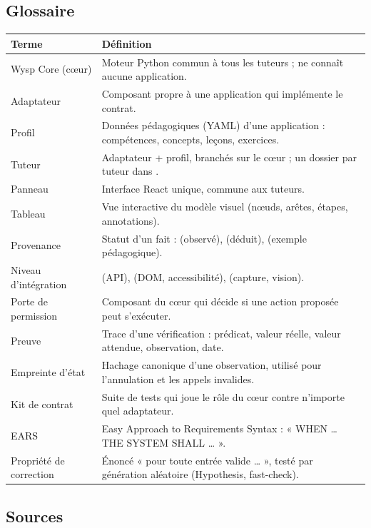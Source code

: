 \subsection{Glossaire}

\begin{xltabular}{\textwidth}{@{}L{3.6cm}Y@{}}
\toprule
\textbf{Terme} & \textbf{Définition} \\
\midrule
Wysp Core (cœur) & Moteur Python commun à tous les tuteurs ; ne connaît aucune application. \\
Adaptateur & Composant propre à une application qui implémente le contrat. \\
Profil & Données pédagogiques (YAML) d'une application : compétences, concepts, leçons, exercices. \\
Tuteur & Adaptateur + profil, branchés sur le cœur ; un dossier par tuteur dans . \\
Panneau & Interface React unique, commune aux tuteurs. \\
Tableau & Vue interactive du modèle visuel (nœuds, arêtes, étapes, annotations). \\
Provenance & Statut d'un fait : \pobs{} (observé), \pinf{} (déduit), \pill{} (exemple pédagogique). \\
Niveau d'intégration &  (API),  (DOM, accessibilité),  (capture, vision). \\
Porte de permission & Composant du cœur qui décide si une action proposée peut s'exécuter. \\
Preuve & Trace d'une vérification : prédicat, valeur réelle, valeur attendue, observation, date. \\
Empreinte d'état & Hachage canonique d'une observation, utilisé pour l'annulation et les appels invalides. \\
Kit de contrat & Suite de tests qui joue le rôle du cœur contre n'importe quel adaptateur. \\
EARS & Easy Approach to Requirements Syntax : « WHEN \dots{} THE SYSTEM SHALL \dots{} ». \\
Propriété de correction & Énoncé « pour toute entrée valide \dots{} », testé par génération aléatoire (Hypothesis, fast-check). \\
\bottomrule
\end{xltabular}

\subsection{Sources}

